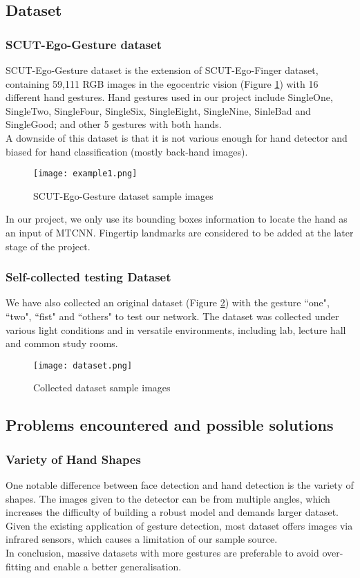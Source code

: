\subsection{Dataset}
\subsubsection{SCUT-Ego-Gesture dataset}
SCUT-Ego-Gesture dataset is the extension of SCUT-Ego-Finger dataset, containing 59,111 RGB images in the egocentric vision (Figure \ref{Fig.main3}) with 16 different hand gestures. Hand gestures used in our project include SingleOne, SingleTwo, SingleFour, SingleSix,  SingleEight, SingleNine, SinleBad and SingleGood; and other 5 gestures with both hands\cite{ego}.\\[.2in]
A downside of this dataset is that it is not various enough for hand detector and biased for hand classification (mostly back-hand images).
\begin{figure}
\centering
\texttt{[image: example1.png]}
\caption{SCUT-Ego-Gesture dataset sample images \cite{ego}} 
\label{Fig.main3}
\end{figure}
In our project, we only use its bounding boxes information to locate the hand as an input of MTCNN. Fingertip landmarks are considered to be added at the later stage of the project. 
\subsubsection{Self-collected testing Dataset}
We have also collected an original dataset (Figure \ref{Fig.main4}) with the gesture ``one", ``two", ``fist" and ``others" to test our network. The dataset was collected under various light conditions and in versatile environments, including lab, lecture hall and common study rooms.

\begin{figure}
\centering
\vspace{.1in}
\texttt{[image: dataset.png]}
\caption{Collected dataset sample images}
\label{Fig.main4}
\end{figure}

\subsection{Problems encountered and possible solutions}
\subsubsection{Variety of Hand Shapes}
One notable difference between face detection and hand detection is the variety of shapes. The images given to the detector can be from multiple angles, which increases the difficulty of building a robust model and demands larger dataset. Given the existing application of gesture detection, most dataset offers images via infrared sensors, which causes a limitation of our sample source.\\[.2in]
In conclusion, massive datasets with more gestures are preferable to avoid over-fitting and enable a better generalisation. 
